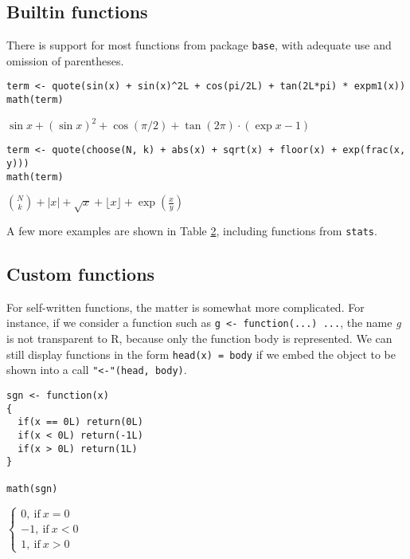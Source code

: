 \hypertarget{builtin-functions}{%
\subsection{Builtin functions}\label{builtin-functions}}

There is support for most functions from package \texttt{base}, with adequate
use and omission of parentheses.

\begin{verbatim}
term <- quote(sin(x) + sin(x)^2L + cos(pi/2L) + tan(2L*pi) * expm1(x))
math(term)
\end{verbatim}

\({{{\sin{x}}{+}{{\left(\sin{x}\right)}^{2}}}{+}{\cos{\left({\pi}{/}{2}\right)}}}{+}{{\tan{\left({2}{{}}{\pi}\right)}}{\cdot}{\left({\exp{x}}{-}{1}\right)}}\)

\begin{verbatim}
term <- quote(choose(N, k) + abs(x) + sqrt(x) + floor(x) + exp(frac(x, y)))
math(term)
\end{verbatim}

\({{{{\binom{N}{k}}{+}{{\left\vert{x}\right\vert}}}{+}{\sqrt{x}}}{+}{\lfloor{x}\rfloor}}{+}{\exp{\left(\frac{x}{y}\right)}}\)

A few more examples are shown in Table
\protect\hyperlink{tab:base-stats}{2},
including functions from \texttt{stats}.

\hypertarget{custom-functions}{%
\subsection{Custom functions}\label{custom-functions}}

For self-written functions, the matter is somewhat more complicated. For
instance, if we consider a function such as \texttt{g~\textless{}-~function(...)~...},
the name \emph{g} is not transparent to R, because only the function body
is represented. We can still display functions in the form \texttt{head(x)~=~body}
if we embed the object to be shown into a call \texttt{"\textless{}-"(head,~body)}.

\begin{verbatim}
sgn <- function(x)
{
  if(x == 0L) return(0L)
  if(x < 0L) return(-1L)
  if(x > 0L) return(1L)
}

math(sgn)
\end{verbatim}

\(\left\{\begin{array}{l}{{0},\ \mathrm{if}\ {{x}{=}{0}}}\\ {{{-}{1}},\ \mathrm{if}\ {{x}{<}{0}}}\\ {{1},\ \mathrm{if}\ {{x}{>}{0}}}\end{array}\right.\)


